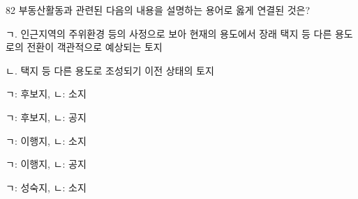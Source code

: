 \begin{question}{82}
부동산활동과 관련된 다음의 내용을 설명하는 용어로 옳게 연결된 것은?
\begin{framedtext}
ㄱ. 인근지역의 주위환경 등의 사정으로 보아 현재의 용도에서 장래 택지 등 다른 용도로의 전환이 객관적으로 예상되는 토지 \par
ㄴ. 택지 등 다른 용도로 조성되기 이전 상태의 토지 \par
\end{framedtext}
\begin{choices}
  \item ㄱ: 후보지, ㄴ: 소지
  \item ㄱ: 후보지, ㄴ: 공지
  \item ㄱ: 이행지, ㄴ: 소지
  \item ㄱ: 이행지, ㄴ: 공지
  \item ㄱ: 성숙지, ㄴ: 소지
\end{choices}
\end{question}
